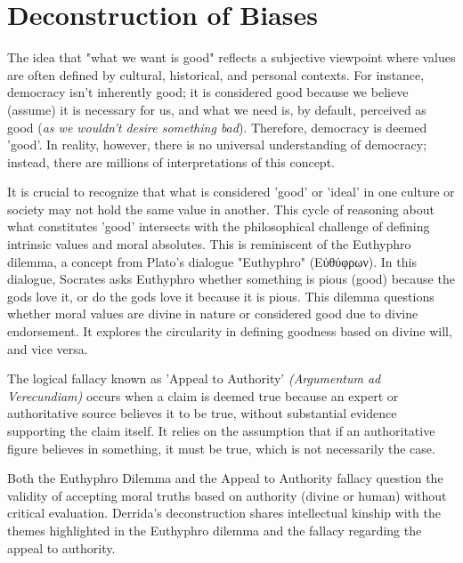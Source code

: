 \documentclass[11pt,a4]{article}
\newcommand{\textgreek}[1]{\begingroup\fontencoding{LGR}\selectfont#1\endgroup}
\begin{document}
    \section{Deconstruction of Biases}
    The idea that "what we want is good" reflects a subjective viewpoint where values are often defined by cultural, historical, and personal contexts. For instance, democracy isn't inherently good; it is considered good because we believe (assume) it is necessary for us, and what we need is, by default, perceived as good (\textit{as we wouldn't desire something bad}). Therefore, democracy is deemed 'good'. In reality, however, there is no universal understanding of democracy; instead, there are millions of interpretations of this concept.
    \par

    It is crucial to recognize that what is considered 'good' or 'ideal' in one culture or society may not hold the same value in another. This cycle of reasoning about what constitutes 'good' intersects with the philosophical challenge of defining intrinsic values and moral absolutes. This is reminiscent of the Euthyphro dilemma, a concept from Plato's dialogue "Euthyphro" \textgreek{(Εὐθύφρων)}. In this dialogue, Socrates asks Euthyphro whether something is pious (good) because the gods love it, or do the gods love it because it is pious. This dilemma questions whether moral values are divine in nature or considered good due to divine endorsement. It explores the circularity in defining goodness based on divine will, and vice versa.

    \par


    The  logical fallacy known as 'Appeal to Authority' \textit{(Argumentum ad Verecundiam)} occurs when a claim is deemed true because an expert or authoritative source believes it to be true, without substantial evidence supporting the claim itself.  It relies on the assumption that if an authoritative figure believes in something, it must be true, which is not necessarily the case.

    \par

    Both the Euthyphro Dilemma and the Appeal to Authority fallacy question the validity of accepting moral truths based on authority (divine or human) without critical evaluation. Derrida's deconstruction\cite{Deconstruction} shares intellectual kinship with the themes highlighted in the Euthyphro dilemma and the fallacy regarding the appeal to authority.
\end{document}
